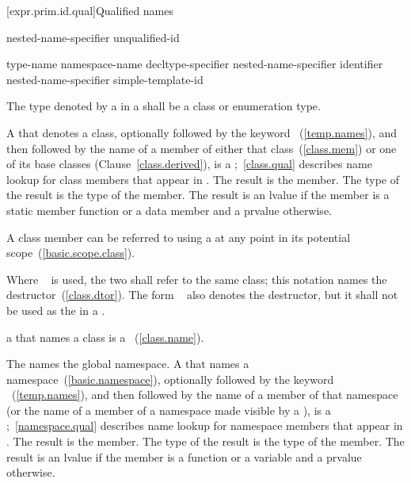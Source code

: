 [expr.prim.id.qual]{Qualified names}

%
%
%
\begin{bnf}
\br
    nested-name-specifier \opt unqualified-id
\end{bnf}

%
%
%
\begin{bnf}
\br
    \terminal{::}\br
    type-name \terminal{::}\br
    namespace-name \terminal{::}\br
    decltype-specifier \terminal{::}\br
    nested-name-specifier identifier \terminal{::}\br
    nested-name-specifier \opt simple-template-id \terminal{::}
\end{bnf}

\pnum
The type denoted by a  in a
 shall be a class or enumeration
type.

\pnum
A  that denotes a class, optionally
followed by the keyword ~(\ref{temp.names}), and then
followed by the name of a member of either that class~(\ref{class.mem})
or one of its base classes (Clause~\ref{class.derived}), is a
%
;~\ref{class.qual} describes name lookup for
class members that appear in . The result is the
member. The type of the result is the type of the member. The result is
an lvalue if the member is a static member function or a data member and a
prvalue otherwise.
\begin{note}
A class member can be referred to using a  at any
point in its potential scope~(\ref{basic.scope.class}).
\end{note}
Where
 \tcode{::\tilde}~ is used,
the two  shall refer to the same class; this
notation names the destructor~(\ref{class.dtor}).
The form \tcode{\tilde}~ also denotes the destructor,
but it shall not be used as the  in a .
\begin{note}
a  that names a class is a
~(\ref{class.name}).
\end{note}

\pnum
The  \tcode{::} names the global namespace.
A  that names a
namespace~(\ref{basic.namespace}), optionally followed by the keyword
~(\ref{temp.names}), and then followed by the name of a member
of that namespace (or the name of a member of a namespace made visible by a
), is a
%
;~\ref{namespace.qual} describes name lookup for
namespace members that appear in . The result is
the member. The type of the result is the type of the member. The result
is an lvalue if the member is a function or a variable and a prvalue otherwise.

